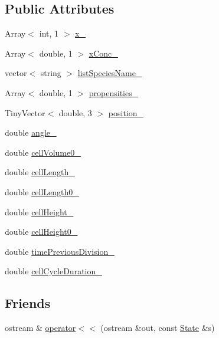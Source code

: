\subsection*{\-Public \-Attributes}
\begin{DoxyCompactItemize}
\item 
\-Array$<$ int, 1 $>$ \hyperlink{class_state_a283b1ba6e0c44e73351cfbc23c5f6208}{x\-\_\-}
\item 
\-Array$<$ double, 1 $>$ \hyperlink{class_state_ae9d97b07af3961c3dea57bc6d18fcaf1}{x\-Conc\-\_\-}
\item 
vector$<$ string $>$ \hyperlink{class_state_a4f25db3d6595db7531c406b3bab9b2ea}{list\-Species\-Name\-\_\-}
\item 
\-Array$<$ double, 1 $>$ \hyperlink{class_state_a5e1c561cb95ed83f9a91dd3faa19f7bb}{propensities\-\_\-}
\item 
\-Tiny\-Vector$<$ double, 3 $>$ \hyperlink{class_state_a488acdebb1d3312dd543ff106358b706}{position\-\_\-}
\item 
double \hyperlink{class_state_a5fed656957b2140ae358da6c835f66f2}{angle\-\_\-}
\item 
double \hyperlink{class_state_ad9506466f0cf4b294e606b8899fd6399}{cell\-Volume0\-\_\-}
\item 
double \hyperlink{class_state_aa7df5457c409b86df9a5be587726ba49}{cell\-Length\-\_\-}
\item 
double \hyperlink{class_state_a994d5634f7c1440f2db9b4c0df381584}{cell\-Length0\-\_\-}
\item 
double \hyperlink{class_state_a8ffa6fbc7b121992d5d7d5dbef3ffce4}{cell\-Height\-\_\-}
\item 
double \hyperlink{class_state_a23f54bcf077dfed8d98ce8325f47d07e}{cell\-Height0\-\_\-}
\item 
double \hyperlink{class_state_accaf47f10a98b8f358865c227cf7ee81}{time\-Previous\-Division\-\_\-}
\item 
double \hyperlink{class_state_ac8cc11c0aa1e35e7dcef4a8bd4582a2b}{cell\-Cycle\-Duration\-\_\-}
\end{DoxyCompactItemize}
\subsection*{\-Friends}
\begin{DoxyCompactItemize}
\item 
ostream \& \hyperlink{class_state_a5f265ea7c747fb68c3551d8034c1ee17}{operator$<$$<$} (ostream \&out, const \hyperlink{class_state}{\-State} \&s)
\end{DoxyCompactItemize}


